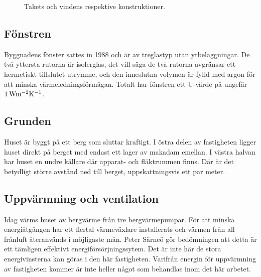 \begin{figure}[hpbt]
\centering
{}
\caption{\label{fig:roof_attic} Takets och vindens respektive konstruktioner.}
\end{figure}


\subsection{Fönstren}

Byggnadens fönster sattes in 1988 och är av treglastyp utan ytbeläggningar. De två yttersta rutorna är isolerglas, det vill säga de två rutorna avgränsar ett hermetiskt tillslutet utrymme, och den inneslutna volymen är fylld med argon för att minska värmeledningsförmågan. Totalt har fönstren ett U-värde på ungefär $\unit[1]{Wm^{-2}K^{-1}}$.

\subsection{Grunden}

Huset är byggt på ett berg som sluttar kraftigt. I östra delen av fastigheten ligger huset direkt på berget med endast ett lager av makadam emellan\cite{petersarneo}. I västra halvan har huset en undre källare där apparat- och fläktrummen finns. Där är det betydligt större avstånd ned till berget, uppskattningsvis ett par meter. %

\subsection{Uppvärmning och ventilation}
Idag värms huset av bergvärme från tre bergvärmepumpar. För att minska energiåtgången har ett flertal värmeväxlare installerats och värmen från all frånluft återanvänds i möjligaste mån. Peter Särneö gör bedömningen att detta är ett tämligen effektivt energiförsörjningssytem. Det är inte här de stora energivinsterna kan göras i den här fastigheten. Varifrån energin för uppvärmning av fastigheten kommer är inte heller något som behandlas inom det här arbetet.
